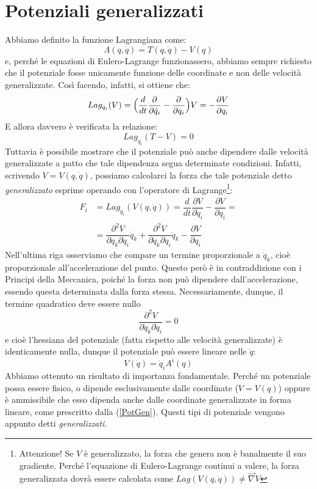 \documentclass[a4paper,openany]{article}
\begin{document}
	\section{Potenziali generalizzati}
	Abbiamo definito la funzione Lagrangiana come:
	\begin{equation}
		\Lambda(q,\dot{q}) = T(q,\dot{q}) - V(q)
	\end{equation}
	e, perché le equazioni di Eulero-Lagrange funzionassero, abbiamo sempre richiesto che il potenziale fosse unicamente funzione delle coordinate e non delle velocità generalizzate. Così facendo, infatti, si ottiene che:
	$$
	Lag_{q_i}(V) = \Bigl(\dfrac{d}{dt}\dfrac{\partial}{\partial \dot{q}_i}-\dfrac{\partial}{\partial q_i}\Bigl) V = -\dfrac{\partial V}{\partial q_i}
	$$
	E allora davvero è verificata la relazione:
	$$
	Lag_{q_i}(T-V) = 0
	$$
	Tuttavia è possibile mostrare che il potenziale può anche dipendere dalle velocità generalizzate a patto che tale dipendenza segua determinate condizioni. Infatti, scrivendo $V = V(q,\dot{q})$, possiamo calcolarci la forza che tale potenziale detto \textit{generalizzato} esprime operando con l'operatore di Lagrange\footnote{Attenzione! Se $V$ è generalizzato, la forza che genera non è banalmente il suo gradiente. Perché l'equazione di Eulero-Lagrange continui a valere, la forza generalizzata dovrà essere calcolata come $Lag(V(q,\dot{q})) \neq \vec{\nabla}V$}:
	\begin{equation}
		\begin{split}
			F_i &= Lag_{q_i}(V(q,\dot{q})) = \dfrac{d}{dt}\dfrac{\partial V}{\partial \dot{q}_i} - \dfrac{\partial V}{\partial q_i} = \\
			&= \dfrac{\partial^2 V}{\partial q_k \partial \dot{q}_i}\dot{q}_k + \dfrac{\partial^2 V}{\partial \dot{q}_k \partial \dot{q}_i}\ddot{q}_k - \dfrac{\partial V}{\partial q_i}
		\end{split}
	\end{equation}
	Nell'ultima riga osserviamo che compare un termine proporzionale a $\ddot{q}_k$, cioè proporzionale all'accelerazione del punto. Questo però è in contraddizione con i Principi della Meccanica, poiché la forza non può dipendere dall'accelerazione, essendo questa determinata dalla forza stessa. Necessariamente, dunque, il termine quadratico deve essere nullo
	$$
	\dfrac{\partial^2 V}{\partial \dot{q}_k \partial \dot{q}_i} = 0
	$$
	e cioè l'hessiana del potenziale (fatta rispetto alle velocità generalizzate) è identicamente nulla, dunque il potenziale può essere lineare nelle $\dot{q}$:
	\begin{equation}
		V(\dot{q}) = \dot{q}_{i}A^{i}(q)
		\label{PotGen}
	\end{equation}
	Abbiamo ottenuto un risultato di importanza fondamentale. Perché un potenziale possa essere fisico, o dipende esclusivamente dalle coordinate ($V=V(q)$) oppure è ammissibile che esso dipenda anche dalle coordinate generalizzate in forma lineare, come prescritto dalla (\ref{PotGen}). Questi tipi di potenziale vengono appunto detti \textit{generalizzati}.
	
\end{document}

